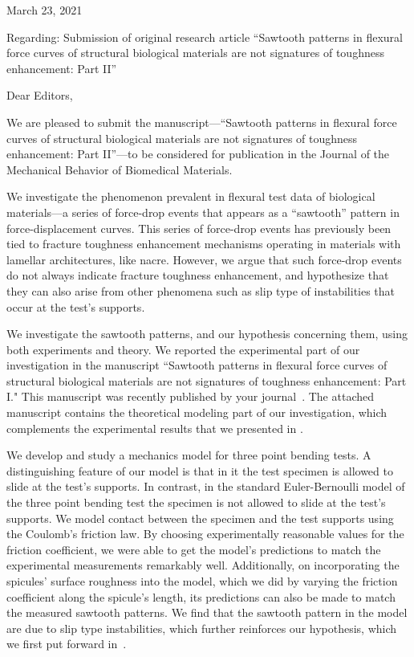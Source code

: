 \documentclass[11pt,letterpaper]{report}
\begin{document}
\pagestyle{empty}
\thispagestyle{fancy}
\phantom{x}
\vspace{1em}

March 23, 2021


\vspace{2em}

Regarding: Submission of original research article ``Sawtooth patterns in flexural force curves of structural biological materials are not signatures of toughness enhancement: Part II''


\vspace{2em}

Dear Editors,


We are pleased to submit the manuscript—``Sawtooth patterns in flexural force curves of structural biological materials are not signatures of toughness enhancement: Part II”—to be considered for publication in the Journal of the Mechanical Behavior of Biomedical Materials.


We investigate the phenomenon prevalent in flexural test data of biological materials—a  series  of  force-drop  events  that  appears  as  a  “sawtooth”  pattern  in  force-displacement  curves. This series of force-drop events has previously been tied to fracture toughness enhancement mechanisms operating in materials with lamellar architectures, like nacre.  However, we argue that such force-drop events do not always indicate fracture toughness enhancement, and hypothesize that they can also arise from other phenomena such as slip type of instabilities that occur at the test's supports.

We investigate the sawtooth patterns, and our hypothesis concerning them, using both experiments and theory. We reported the experimental part of our investigation in the manuscript
 ``Sawtooth patterns in flexural force curves of structural biological materials are not signatures of toughness enhancement: Part I." This manuscript was recently published by your journal~\cite{kochiyama2021sawtooth}. The attached manuscript contains the theoretical modeling part of our investigation, which complements the experimental results that we presented in \cite{kochiyama2021sawtooth}.


We develop and study a mechanics model for three point bending tests. A distinguishing feature of our model is that in it the test specimen is allowed to slide at the test's supports. In contrast, in the standard Euler-Bernoulli model of the three point bending test the specimen is not allowed to slide at the test's supports. We model contact between the specimen and the test supports using the Coulomb's friction law. By choosing experimentally reasonable values for the friction coefficient, we were able to get the model's predictions to match the experimental measurements remarkably well. Additionally, on incorporating the spicules' surface roughness into the model, which we did by varying the friction coefficient along the spicule's length, its predictions can also be made to match the measured sawtooth patterns. We find that the sawtooth pattern in the model are due to slip type instabilities, which further reinforces our hypothesis, which we first put forward in~\cite{kochiyama2021sawtooth}.
\end{document}
